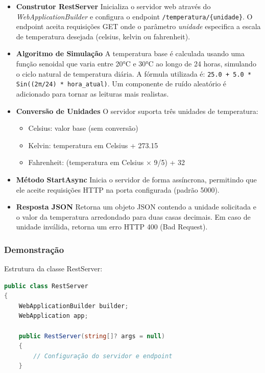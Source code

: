 \documentclass[
	12pt,				%
	oneside,			%
	a4paper,			%
	english,			%
	brazil,				%
	]{abntex2}
\begin{document}
{\begin{itemize}
    \item \textbf{Construtor RestServer}
    Inicializa o servidor web através do \textit{WebApplicationBuilder} e configura o endpoint \texttt{/temperatura/\{unidade\}}. O endpoint aceita requisições GET onde o parâmetro \textit{unidade} especifica a escala de temperatura desejada (celsius, kelvin ou fahrenheit).
    
    \item \textbf{Algoritmo de Simulação}
    A temperatura base é calculada usando uma função senoidal que varia entre 20°C e 30°C ao longo de 24 horas, simulando o ciclo natural de temperatura diária. A fórmula utilizada é: \texttt{25.0 + 5.0 * Sin((2π/24) * hora\_atual)}. Um componente de ruído aleatório é adicionado para tornar as leituras mais realistas.
    
    \item \textbf{Conversão de Unidades}
    O servidor suporta três unidades de temperatura:
    \begin{itemize}
        \item Celsius: valor base (sem conversão)
        \item Kelvin: temperatura em Celsius + 273.15
        \item Fahrenheit: (temperatura em Celsius × 9/5) + 32
    \end{itemize}
    
    \item \textbf{Método StartAsync}
    Inicia o servidor de forma assíncrona, permitindo que ele aceite requisições HTTP na porta configurada (padrão 5000).
    
    \item \textbf{Resposta JSON}
    Retorna um objeto JSON contendo a unidade solicitada e o valor da temperatura arredondado para duas casas decimais. Em caso de unidade inválida, retorna um erro HTTP 400 (Bad Request).
\end{itemize}

\subsubsection{Demonstração}
Estrutura da classe RestServer:
\begin{lstlisting}[language=csharp]
public class RestServer
{
    WebApplicationBuilder builder;
    WebApplication app;
    
    public RestServer(string[]? args = null)
    {
        // Configuração do servidor e endpoint
    }
    

\end{lstlisting}}
\end{document}
